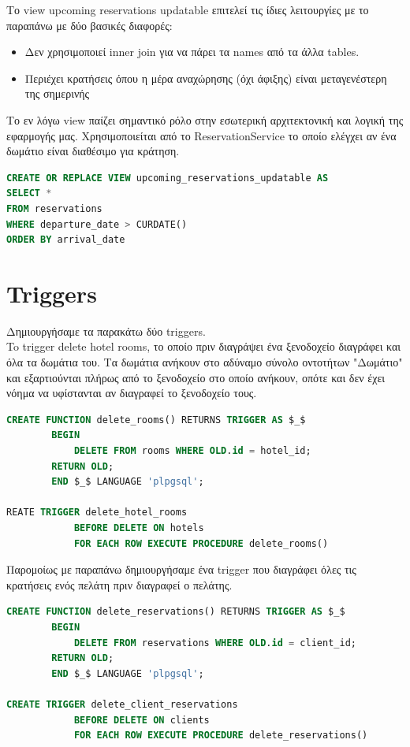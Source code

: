 \documentclass[a4paper,12pt]{article}
\begin{document}
Το view upcoming reservations updatable επιτελεί τις ίδιες λειτουργίες με το παραπάνω με δύο βασικές διαφορές:
\begin{itemize}
  \item Δεν χρησιμοποιεί inner join για να πάρει τα names από τα άλλα tables.
  \item Περιέχει κρατήσεις όπου η μέρα αναχώρησης (όχι άφιξης) είναι μεταγενέστερη της σημερινής
\end{itemize}
Το εν λόγω view παίζει σημαντικό ρόλο στην εσωτερική αρχιτεκτονική και λογική της εφαρμογής μας. Χρησιμοποιείται από το ReservationService το οποίο ελέγχει αν ένα δωμάτιο είναι διαθέσιμο για κράτηση.

\begin{lstlisting}[language=SQL]
CREATE OR REPLACE VIEW upcoming_reservations_updatable AS
SELECT *
FROM reservations
WHERE departure_date > CURDATE()
ORDER BY arrival_date
\end{lstlisting}

\section{Triggers}
Δημιουργήσαμε τα παρακάτω δύο triggers.\\
To trigger delete hotel rooms, το οποίο πριν διαγράψει ένα ξενοδοχείο διαγράφει και όλα τα δωμάτια του. Τα δωμάτια ανήκουν στο  αδύναμο σύνολο οντοτήτων "Δωμάτιο" και εξαρτιούνται πλήρως από το ξενοδοχείο στο οποίο ανήκουν, οπότε και δεν έχει νόημα να υφίστανται αν διαγραφεί το ξενοδοχείο τους.

\begin{lstlisting}[language=SQL]
CREATE FUNCTION delete_rooms() RETURNS TRIGGER AS $_$
        BEGIN
            DELETE FROM rooms WHERE OLD.id = hotel_id;
        RETURN OLD;
        END $_$ LANGUAGE 'plpgsql';
        
REATE TRIGGER delete_hotel_rooms
  			BEFORE DELETE ON hotels 
  			FOR EACH ROW EXECUTE PROCEDURE delete_rooms()
\end{lstlisting}

Παρομοίως με παραπάνω δημιουργήσαμε ένα trigger που διαγράφει όλες τις κρατήσεις ενός πελάτη πριν διαγραφεί ο πελάτης.

\begin{lstlisting}[language=SQL]
CREATE FUNCTION delete_reservations() RETURNS TRIGGER AS $_$
        BEGIN
            DELETE FROM reservations WHERE OLD.id = client_id;
        RETURN OLD;
        END $_$ LANGUAGE 'plpgsql';
        
CREATE TRIGGER delete_client_reservations
  			BEFORE DELETE ON clients
  			FOR EACH ROW EXECUTE PROCEDURE delete_reservations()      
\end{lstlisting}
\end{document}
